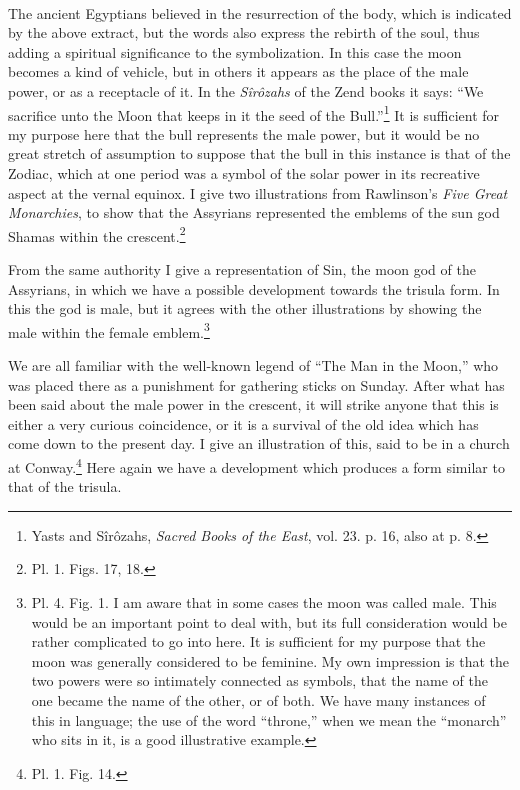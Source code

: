 \documentclass[a4paper, 11pt, oneside, english]{article}
\begin{document}
\paragraph{}
The ancient Egyptians believed in the resurrection of the body, which is indicated by the above extract, but the words also express the rebirth of the soul, thus adding a spiritual significance to the symbolization. In this case the moon becomes a kind of vehicle, but in others it appears as the place of the male power, or as a receptacle of it. In the \emph{Sîrôzahs} of the Zend books it says: ``We sacrifice unto the Moon that keeps in it the seed of the Bull.''\footnote{Yasts and Sîrôzahs, \emph{Sacred Books of the East}, vol. 23. p. 16, also at p. 8.} It is sufficient for my purpose here that the bull represents the male power, but it would be no great stretch of assumption to suppose that the bull in this instance is that of the Zodiac, which at one period was a symbol of the solar power in its recreative aspect at the vernal equinox. I give two illustrations from Rawlinson's \emph{Five Great Monarchies}, to show that the Assyrians represented the emblems of the sun god Shamas within the crescent.\footnote{Pl. 1. Figs. 17, 18.}

From the same authority I give a representation of Sin, the moon god of the Assyrians, in which we have a possible development towards the trisula form. In this the god is male, but it agrees with the other illustrations by showing the male within the female emblem.\footnote{Pl. 4. Fig. 1. I am aware that in some cases the moon was called male. This would be an important point to deal with, but its full consideration would be rather complicated to go into here. It is sufficient for my purpose that the moon was generally considered to be feminine. My own impression is that the two powers were so intimately connected as symbols, that the name of the one became the name of the other, or of both. We have many instances of this in language; the use of the word ``throne,'' when we mean the ``monarch'' who sits in it, is a good illustrative example.}

We are all familiar with the well-known legend of ``The Man in the Moon,'' who was placed there as a punishment for gathering sticks on Sunday. After what has been said about the male power in the crescent, it will strike anyone that this is either a very curious coincidence, or it is a survival of the old idea which has come down to the present day. I give an illustration of this, said to be in a church at Conway.\footnote{Pl. 1. Fig. 14.} Here again we have a development which produces a form similar to that of the trisula.
\end{document}
